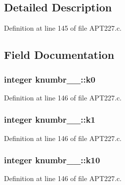 \subsection{Detailed Description}


Definition at line 145 of file A\+P\+T227.\+c.



\subsection{Field Documentation}
\subsubsection[{\texorpdfstring{k0}{k0}}]{\setlength{\rightskip}{0pt plus 5cm}integer knumbr\+\_\+\_\+\+::k0}\hypertarget{structknumbr__1___ab49ab847f32d22999d34d534b38acbdd}{}\label{structknumbr__1___ab49ab847f32d22999d34d534b38acbdd}


Definition at line 146 of file A\+P\+T227.\+c.

\subsubsection[{\texorpdfstring{k1}{k1}}]{\setlength{\rightskip}{0pt plus 5cm}integer knumbr\+\_\+\_\+\+::k1}\hypertarget{structknumbr__1___ac122d2150c4514daa2ea467de244eecf}{}\label{structknumbr__1___ac122d2150c4514daa2ea467de244eecf}


Definition at line 146 of file A\+P\+T227.\+c.

\subsubsection[{\texorpdfstring{k10}{k10}}]{\setlength{\rightskip}{0pt plus 5cm}integer knumbr\+\_\+\_\+\+::k10}\hypertarget{structknumbr__1___ab1b0b2f6ac57708477e9deb25eac2ba4}{}\label{structknumbr__1___ab1b0b2f6ac57708477e9deb25eac2ba4}


Definition at line 146 of file A\+P\+T227.\+c.

